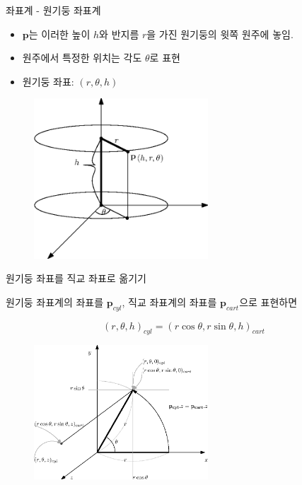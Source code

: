 \begin{frame}{좌표계 - 원기둥 좌표계}

\begin{itemize}
\item $\mathbf p$는 이러한 높이 $h$와 반지름 $r$을 가진 원기둥의 윗쪽 원주에 놓임.
\item 원주에서 특정한 위치는 각도 $\theta$로 표현
\item 원기둥 좌표: $(r, \theta, h)$
\end{itemize}

\begin{figure}
    \includegraphics[width=6.5cm]{Math_transform/cylindricCoord.eps}
\end{figure}

\end{frame}

\begin{frame}{원기둥 좌표를 직교 좌표로 옮기기}

원기둥 좌표계의 좌표를 $\mathbf p_{cyl}$, 직교 좌표계의 좌표를 $\mathbf p_{cart}$으로 표현하면

$$(r, \theta, h)_{cyl} = ( r \cos \theta , r \sin \theta, h)_{cart}$$

\begin{figure}[h!]
  \centering
    \includegraphics[width=6.5cm]{Math_transform/cyl2Cartesian.eps}
\end{figure}

\end{frame}


